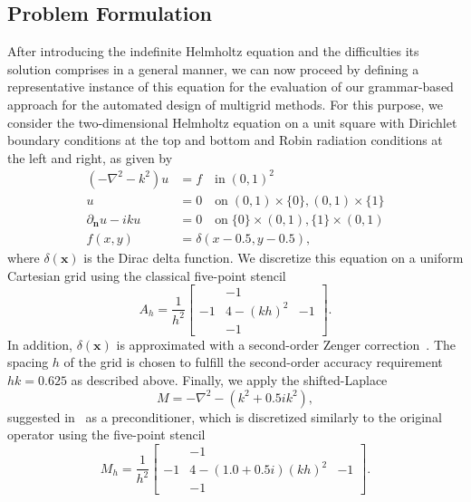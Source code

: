\subsection{Problem Formulation}
After introducing the indefinite Helmholtz equation and the difficulties its solution comprises in a general manner, we can now proceed by defining a representative instance of this equation for the evaluation of our grammar-based approach for the automated design of multigrid methods.
For this purpose, we consider the two-dimensional Helmholtz equation on a unit square with Dirichlet boundary conditions at the top and bottom and Robin radiation conditions at the left and right, as given by
\begin{equation}
	\label{eq:helmholtz-test-problem}
	\begin{split}
		(-\nabla ^{2} - k^{2}) u & = f \quad \text{in} \; \left( 0, 1 \right)^2 \\
		u & = 0 \quad \text{on} \; \left( 0, 1 \right) \times \{0\}, \left( 0, 1 \right) \times \{1\} \\
		\partial_{\mathbf{n}} u - iku & = 0 \quad \text{on} \; \{0\} \times \left( 0, 1 \right), \{1\} \times \left( 0, 1 \right) \\
		f(x, y) & = \delta(x - 0.5, y - 0.5),
	\end{split}
\end{equation}
where $\delta(\bm{x})$ is the Dirac delta function.
We discretize this equation on a uniform Cartesian grid using the classical five-point stencil
\begin{equation*}
	A_h = \frac{1}{h^2} \begin{bmatrix}
		& -1 & \\
		-1 & 4 - (k h)^2 & -1 \\
		& -1 &  
	\end{bmatrix}.
\end{equation*}
In addition, $\delta(\bm{x})$ is approximated with a second-order Zenger correction~\cite{koestler2004extrapolation}.
The spacing $h$ of the grid is chosen to fulfill the second-order accuracy requirement $h k = 0.625$ as described above.
Finally, we apply the shifted-Laplace
\begin{equation*}
	M = -\nabla^{2} - (k^{2} + 0.5 i k^{2}),
\end{equation*}
suggested in~\cite{erlangga2008advances} as a preconditioner, which is discretized similarly to the original operator using the five-point stencil
\begin{equation*}
	M_h = \frac{1}{h^2} \begin{bmatrix}
		& -1 & \\
		-1 & 4 - (1.0 + 0.5i)(k h)^2 & -1 \\
		& -1 &  
	\end{bmatrix}.
\end{equation*}
